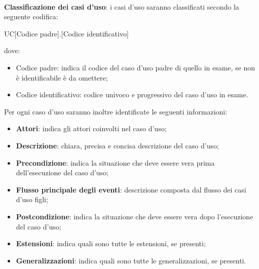 	~\\ \textbf{Classificazione dei casi d'uso}: i casi d’uso saranno classificati secondo la seguente codifica:
		\begin{center}
			UC[Codice padre].[Codice identificativo]
		\end{center}
	dove:
		\begin{itemize}
			\item Codice padre: indica il codice del caso d’uso padre di quello in esame, se non è identificabile è da omettere;
			\item Codice identificativo: codice univoco e progressivo del caso d’uso in esame.
		\end{itemize}
	Per ogni caso d’uso saranno inoltre identificate le seguenti informazioni:
		\begin{itemize}
			\item \textbf{Attori}: indica gli attori coinvolti nel caso d’uso;
			\item \textbf{Descrizione}: chiara, precisa e concisa descrizione del caso d’uso;
			\item \textbf{Precondizione}: indica la situazione che deve essere vera prima dell’esecuzione del caso d’uso;
			\item \textbf{Flusso principale degli eventi}: descrizione composta dal flusso dei casi d’uso figli;
			\item \textbf{Postcondizione}: indica la situazione che deve essere vera dopo l’esecuzione del caso d’uso;
			\item \textbf{Estensioni}: indica quali sono tutte le estensioni, se presenti;
			\item \textbf{Generalizzazioni}: indica quali sono tutte le generalizzazioni, se presenti.
		\end{itemize}
	
